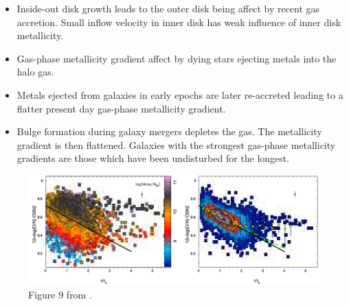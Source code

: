 \documentclass[11pt, a4paper, onecolumn]{article}
\begin{document}
\begin{multicols}{2}
\begin{itemize}
        \item Inside-out disk growth leads to the outer disk being affect by
        recent gas accretion. Small inflow velocity in inner disk has weak
        influence of inner disk metallicity. 
        
        \item Gas-phase metallicity gradient affect by dying stars ejecting
        metals into the halo gas. 

        \item Metals ejected from galaxies in early epochs are later
        re-accreted leading to a flatter present day gas-phase metallicity
        gradient.

        \item Bulge formation during galaxy mergers depletes the gas. The
        metallicity gradient is then flattened. Galaxies with the strongest
        gas-phase metallicity gradients are those which have been undisturbed
        for the longest.

    \end{itemize}




\end{multicols}
\begin{figure}[!ht]

    \includegraphics[scale=0.45]{figures/sanchez12_fig9.pdf}

    \caption{Figure 9 from \citet{sanchez12}.}

\end{figure}
\end{document}
